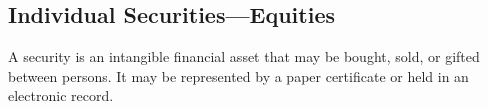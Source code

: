 \subsection{Individual Securities—Equities}

\begin{definition}[Security]
A security is an intangible financial asset that may be bought, sold, or gifted between persons. It may be represented by a paper certificate or held in an electronic record. 
\end{definition}
